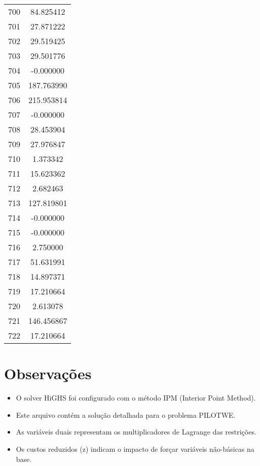 \documentclass[12pt]{article}
\begin{document}
\begin{longtable}{@{}cc@{}}
700 & 84.825412 \\
701 & 27.871222 \\
702 & 29.519425 \\
703 & 29.501776 \\
704 & -0.000000 \\
705 & 187.763990 \\
706 & 215.953814 \\
707 & -0.000000 \\
708 & 28.453904 \\
709 & 27.976847 \\
710 & 1.373342 \\
711 & 15.623362 \\
712 & 2.682463 \\
713 & 127.819801 \\
714 & -0.000000 \\
715 & -0.000000 \\
716 & 2.750000 \\
717 & 51.631991 \\
718 & 14.897371 \\
719 & 17.210664 \\
720 & 2.613078 \\
721 & 146.456867 \\
722 & 17.210664 \\

\end{longtable}


\section{Observações}

\begin{itemize}
\item O solver HiGHS foi configurado com o método IPM (Interior Point Method).
\item Este arquivo contém a solução detalhada para o problema PILOTWE.
\item As variáveis duais representam os multiplicadores de Lagrange das restrições.
\item Os custos reduzidos (z) indicam o impacto de forçar variáveis não-básicas na base.
\end{itemize}
\end{document}
